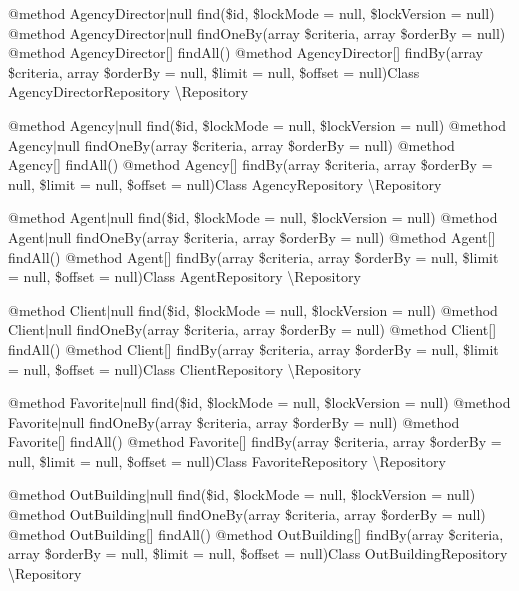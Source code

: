 @method Agency\+Director$\vert$null find(\$id, \$lock\+Mode = null, \$lock\+Version = null) @method Agency\+Director$\vert$null find\+One\+By(array \$criteria, array \$order\+By = null) @method Agency\+Director\mbox{[}\mbox{]} find\+All() @method Agency\+Director\mbox{[}\mbox{]} find\+By(array \$criteria, array \$order\+By = null, \$limit = null, \$offset = null)Class Agency\+Director\+Repository \textbackslash{}\+Repository

@method Agency$\vert$null find(\$id, \$lock\+Mode = null, \$lock\+Version = null) @method Agency$\vert$null find\+One\+By(array \$criteria, array \$order\+By = null) @method Agency\mbox{[}\mbox{]} find\+All() @method Agency\mbox{[}\mbox{]} find\+By(array \$criteria, array \$order\+By = null, \$limit = null, \$offset = null)Class Agency\+Repository \textbackslash{}\+Repository

@method Agent$\vert$null find(\$id, \$lock\+Mode = null, \$lock\+Version = null) @method Agent$\vert$null find\+One\+By(array \$criteria, array \$order\+By = null) @method Agent\mbox{[}\mbox{]} find\+All() @method Agent\mbox{[}\mbox{]} find\+By(array \$criteria, array \$order\+By = null, \$limit = null, \$offset = null)Class Agent\+Repository \textbackslash{}\+Repository

@method Client$\vert$null find(\$id, \$lock\+Mode = null, \$lock\+Version = null) @method Client$\vert$null find\+One\+By(array \$criteria, array \$order\+By = null) @method Client\mbox{[}\mbox{]} find\+All() @method Client\mbox{[}\mbox{]} find\+By(array \$criteria, array \$order\+By = null, \$limit = null, \$offset = null)Class Client\+Repository \textbackslash{}\+Repository

@method Favorite$\vert$null find(\$id, \$lock\+Mode = null, \$lock\+Version = null) @method Favorite$\vert$null find\+One\+By(array \$criteria, array \$order\+By = null) @method Favorite\mbox{[}\mbox{]} find\+All() @method Favorite\mbox{[}\mbox{]} find\+By(array \$criteria, array \$order\+By = null, \$limit = null, \$offset = null)Class Favorite\+Repository \textbackslash{}\+Repository

@method Out\+Building$\vert$null find(\$id, \$lock\+Mode = null, \$lock\+Version = null) @method Out\+Building$\vert$null find\+One\+By(array \$criteria, array \$order\+By = null) @method Out\+Building\mbox{[}\mbox{]} find\+All() @method Out\+Building\mbox{[}\mbox{]} find\+By(array \$criteria, array \$order\+By = null, \$limit = null, \$offset = null)Class Out\+Building\+Repository \textbackslash{}\+Repository

